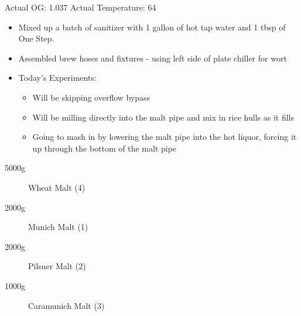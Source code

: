 Actual OG: 1.037
Actual Temperature: 64

\def\todaysdate{20201113}
\newday{\todaysdate}\label{\todaysdate}


\begin{itemize}
    \item Mixed up a batch of sanitizer with 1 gallon of hot tap water and 1 tbsp of One Step.
    \item Assembled brew hoses and fixtures - using left side of plate chiller for wort
    \item Today's Experiments:
        \begin{itemize}
            \item Will be skipping overflow bypass
            \item Will be milling directly into the malt pipe and mix in rice hulls as it fills
            \item Going to mash in by lowering the malt pipe into the hot liquor, forcing it up through the bottom of the malt pipe
        \end{itemize}
\end{itemize}

\begin{description}
    \item[5000g] Wheat Malt (4)
    \item[2000g] Munich Malt (1)
    \item[2000g] Pilsner Malt (2)
    \item[1000g] Caramunich Malt (3)
\end{description}

